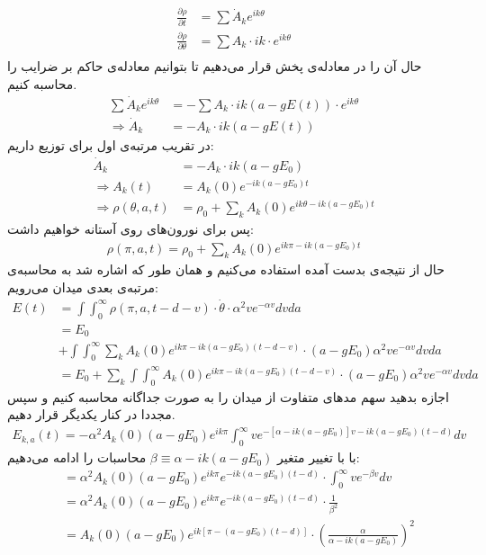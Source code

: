 \begin{align}
	\frac{\partial \rho}{\partial t} &= \sum \dot A_k e^{ik\theta}\\
	\frac{\partial \rho}{\partial \theta} &= \sum A_k \cdot ik \cdot e^{ik\theta}\\
\end{align}
حال آن را در معادله‌ی پخش قرار می‌دهیم تا بتوانیم معادله‌ی حاکم بر ضرایب را محاسبه کنیم.
\begin{align}
	\sum \dot A_k e^{ik\theta} &= - \sum A_k \cdot ik(a - gE(t)) \cdot e^{ik\theta}\\
	\Rightarrow \dot A_k &= - A_k \cdot ik(a - gE(t))
\end{align}
در تقریب مرتبه‌ی اول برای توزیع داریم:
\begin{align}
	\dot A_k &= - A_k \cdot ik(a - g E_0)\\
	\Rightarrow A_k(t) &= A_k(0) e^{- ik(a-gE_0)t}\\
	\Rightarrow \rho(\theta, a, t) &= \rho_0 + \sum_k A_k(0) e^{ik\theta - ik(a - gE_0)t}
\end{align}
پس برای نورون‌های روی آستانه خواهیم داشت:
\begin{align}
	\rho(\pi, a, t) = \rho_0 + \sum_k A_k(0) e^{ik\pi - ik(a - gE_0)t}
\end{align}
حال از نتیجه‌ی بدست آمده استفاده می‌کنیم و همان طور که اشاره شد به محاسبه‌ی مرتبه‌ی بعدی میدان می‌رویم:
\begin{align}
	E(t) &= \int \int_{0}^{\infty} \rho(\pi, a, t-d-v)\cdot \dot \theta \cdot \alpha^2 ve^{-\alpha v} dv da \label{eq:perturbed_field}\\
	&= E_0\\
	&+ \int \int_{0}^{\infty} \sum_k A_k(0) e^{ik\pi - ik(a - gE_0)(t-d - v)} \cdot (a - gE_0) \alpha^2 ve^{-\alpha v} dv da \\
	&= E_0 + \sum_k \int \int_{0}^{\infty} A_k(0) e^{ik\pi - ik(a - gE_0)(t-d - v)} \cdot (a - gE_0) \alpha^2 ve^{-\alpha v} dv da
\end{align}
اجازه بدهید سهم مدهای متفاوت از میدان را به صورت جداگانه محاسبه کنیم و سپس مجددا در کنار یکدیگر قرار دهیم.
\begin{align}
	E_{k,a}(t) = -\alpha^2 A_k(0)(a - gE_0) e^{ik\pi}\int^{\infty}_{0} v e^{-[\alpha - ik(a - gE_0)]v-ik(a - gE_0)(t-d)} dv
\end{align}
با با تغییر متغیر 
$\beta \equiv \alpha - ik(a-gE_0)$
محاسبات را ادامه می‌دهیم:
\begin{align}
	&= \alpha^2 A_k(0) (a - gE_0) e^{ik\pi} e^{-ik(a-gE_0)(t-d)} \cdot \int^{\infty}_0 v e^{-\beta v}dv \\
	&= \alpha^2 A_k(0) (a - gE_0) e^{ik\pi} e^{-ik(a-gE_0)(t-d)} \cdot \frac{1}{\beta^2} \\
	&= A_k(0) (a - gE_0) e^{ik[\pi -(a-gE_0)(t-d)]} \cdot (\frac{\alpha}{\alpha-ik(a-gE_0)})^2
\end{align}

